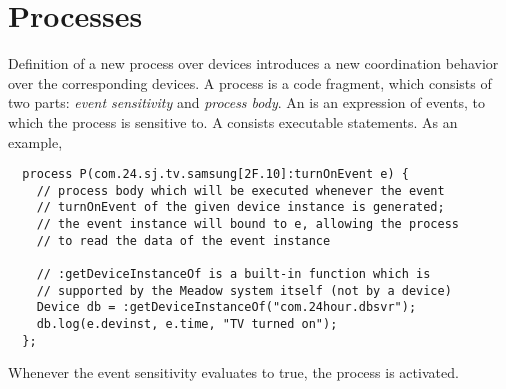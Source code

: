 \documentclass{note}
\begin{document}
\section{Processes}\label{sec:proc}
Definition of a new process over devices introduces a new coordination
behavior over the corresponding devices.
A process is a code fragment, which consists of two parts:
{\em event sensitivity\/} and {\em process body\/}. 
An  is an expression of events, 
to which the process is
sensitive to. A  consists executable statements.
As an example,
\begin{verbatim}
  process P(com.24.sj.tv.samsung[2F.10]:turnOnEvent e) {
    // process body which will be executed whenever the event
    // turnOnEvent of the given device instance is generated;
    // the event instance will bound to e, allowing the process
    // to read the data of the event instance

    // :getDeviceInstanceOf is a built-in function which is 
    // supported by the Meadow system itself (not by a device)
    Device db = :getDeviceInstanceOf("com.24hour.dbsvr");
    db.log(e.devinst, e.time, "TV turned on");
  };
\end{verbatim}
Whenever the event sensitivity evaluates to true, the process is
activated. 



\end{document}
